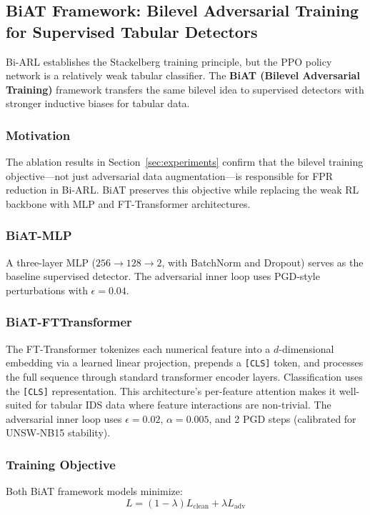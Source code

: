 \subsection{BiAT Framework: Bilevel Adversarial Training for Supervised Tabular Detectors}
\label{sec:biat}

Bi-ARL establishes the Stackelberg training principle, but the PPO policy network is a relatively weak tabular classifier. The \textbf{BiAT (Bilevel Adversarial Training)} framework transfers the same bilevel idea to supervised detectors with stronger inductive biases for tabular data.

\subsubsection{Motivation}
The ablation results in Section~\ref{sec:experiments} confirm that the bilevel training objective---not just adversarial data augmentation---is responsible for FPR reduction in Bi-ARL. BiAT preserves this objective while replacing the weak RL backbone with MLP and FT-Transformer \cite{gorishniy2021fttransformer} architectures.

\subsubsection{BiAT-MLP}
A three-layer MLP ($256 \to 128 \to 2$, with BatchNorm and Dropout) serves as the baseline supervised detector. The adversarial inner loop uses PGD-style perturbations with $\epsilon = 0.04$.

\subsubsection{BiAT-FTTransformer}
The FT-Transformer \cite{gorishniy2021fttransformer} tokenizes each numerical feature into a $d$-dimensional embedding via a learned linear projection, prepends a \texttt{[CLS]} token, and processes the full sequence through standard transformer encoder layers. Classification uses the \texttt{[CLS]} representation. This architecture's per-feature attention makes it well-suited for tabular IDS data where feature interactions are non-trivial. The adversarial inner loop uses $\epsilon = 0.02$, $\alpha = 0.005$, and 2 PGD steps (calibrated for UNSW-NB15 stability).

\subsubsection{Training Objective}
Both BiAT framework models minimize:
\begin{equation}
    L = (1 - \lambda) L_{\text{clean}} + \lambda L_{\text{adv}}
    \label{eq:biat_loss}
\end{equation}


